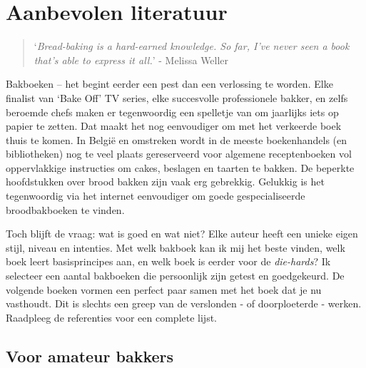 \documentclass[
  11pt,
  dutch,
]{memoir}
\begin{document}
\hypertarget{aanbevolen-literatuur}{%
\chapter{Aanbevolen literatuur}\label{aanbevolen-literatuur}}

\begin{quote}
`\emph{Bread-baking is a hard-earned knowledge. So far, I've never seen
a book that's able to express it all.}' - \mbox{Melissa} Weller
\end{quote}

Bakboeken -- het begint eerder een pest dan een verlossing te worden.
Elke finalist van `Bake Off' TV series, elke succesvolle professionele
bakker, en zelfs beroemde chefs maken er tegenwoordig een spelletje van
om jaarlijks iets op papier te zetten. Dat maakt het nog eenvoudiger om
met het verkeerde boek thuis te komen. In België en omstreken wordt in
de meeste boekenhandels (en bibliotheken) nog te veel plaats
gereserveerd voor algemene receptenboeken vol oppervlakkige instructies
om cakes, beslagen en taarten te bakken. De beperkte hoofdstukken over
brood bakken zijn vaak erg gebrekkig. Gelukkig is het tegenwoordig via
het internet eenvoudiger om goede gespecialiseerde broodbakboeken te
vinden.

Toch blijft de vraag: wat is goed en wat niet? Elke auteur heeft een
unieke eigen stijl, niveau en intenties. Met welk bakboek kan ik mij het
beste vinden, welk boek leert basisprincipes aan, en welk boek is eerder
voor de \emph{die-hards}? Ik selecteer een aantal bakboeken die
persoonlijk zijn getest en goedgekeurd. De volgende boeken vormen een
perfect paar samen met het boek dat je nu vasthoudt. Dit is slechts een
greep van de verslonden - of doorploeterde - werken. Raadpleeg de
referenties voor een complete lijst.

\hypertarget{voor-amateur-bakkers}{%
\section{Voor amateur bakkers}\label{voor-amateur-bakkers}}
\end{document}
